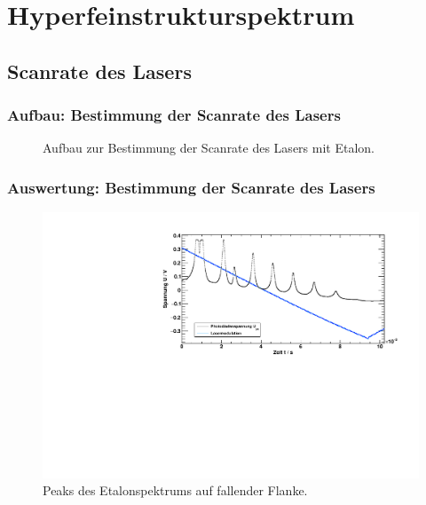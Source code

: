 
\section{Hyperfeinstrukturspektrum}
\subsection{Scanrate des Lasers}


\begin{frame}
\frametitle{Aufbau: Bestimmung der Scanrate des Lasers}

\begin{figure}
    \centering
    \def\svgwidth{\textwidth}
    
    \caption{Aufbau zur Bestimmung der Scanrate des Lasers mit Etalon.}
\end{figure}
\end{frame}


\begin{frame}
\frametitle{Auswertung: Bestimmung der Scanrate des Lasers}
\begin{figure}
    \centering
    \includegraphics[width=\textwidth]{../img/down-etalon_zoom.pdf} %
    \caption{Peaks des Etalonspektrums auf fallender Flanke.}
\end{figure}
\end{frame}


